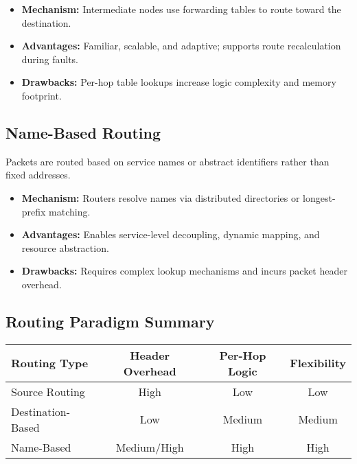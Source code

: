 \documentclass[../../../OAE-SPEC-MAIN.tex]{subfiles}
\begin{document}
\begin{itemize}
\item \textbf{Mechanism:} Intermediate nodes use forwarding tables to route toward the destination.
\item \textbf{Advantages:} Familiar, scalable, and adaptive; supports route recalculation during faults.
\item \textbf{Drawbacks:} Per-hop table lookups increase logic complexity and memory footprint.
\end{itemize}

\subsection{Name-Based Routing}

Packets are routed based on service names or abstract identifiers rather than fixed addresses.

\begin{itemize}
\item \textbf{Mechanism:} Routers resolve names via distributed directories or longest-prefix matching.
\item \textbf{Advantages:} Enables service-level decoupling, dynamic mapping, and resource abstraction.
\item \textbf{Drawbacks:} Requires complex lookup mechanisms and incurs packet header overhead.
\end{itemize}

\subsection{Routing Paradigm Summary}

\begin{center}
\begin{tabular}{lccc}
\toprule
\textbf{Routing Type} & \textbf{Header Overhead} & \textbf{Per-Hop Logic} & \textbf{Flexibility} \\
\midrule
Source Routing        & High                    & Low                & Low         \\
Destination-Based     & Low                     & Medium             & Medium      \\
Name-Based            & Medium/High             & High               & High        \\
\bottomrule
\end{tabular}
\end{center}
\end{document}
